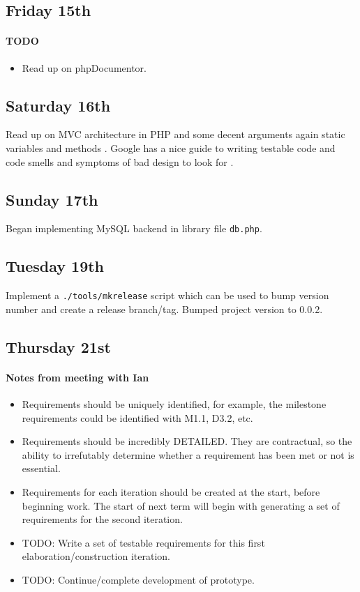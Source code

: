 \subsection{Friday 15th}
\paragraph{TODO}
\begin{itemize}
\item Read up on phpDocumentor.
\end{itemize}

\subsection{Saturday 16th}
Read up on MVC architecture in PHP \cite{Butler2010} and some decent arguments
again static variables and methods \cite{Butler2012}. Google has a nice guide to
writing testable code and code smells and symptoms of bad design to look for
\cite{Hevery2008}.

\subsection{Sunday 17th}
Began implementing MySQL backend in library file \texttt{db.php}.

\subsection{Tuesday 19th}
Implement a \texttt{./tools/mkrelease} script which can be used to bump version
number and create a release branch/tag. Bumped project version to 0.0.2.

\subsection{Thursday 21st}
\paragraph{Notes from meeting with Ian}
\begin{itemize}
\item Requirements should be uniquely identified, for example, the milestone
  requirements could be identified with M1.1, D3.2, etc.
\item Requirements should be incredibly DETAILED. They are contractual, so the
  ability to irrefutably determine whether a requirement has been met or not is
  essential.
\item Requirements for each iteration should be created at the start, before
  beginning work. The start of next term will begin with generating a set of
  requirements for the second iteration.
\item TODO: Write a set of testable requirements for this first
  elaboration/construction iteration.
\item TODO: Continue/complete development of prototype.
\end{itemize}

